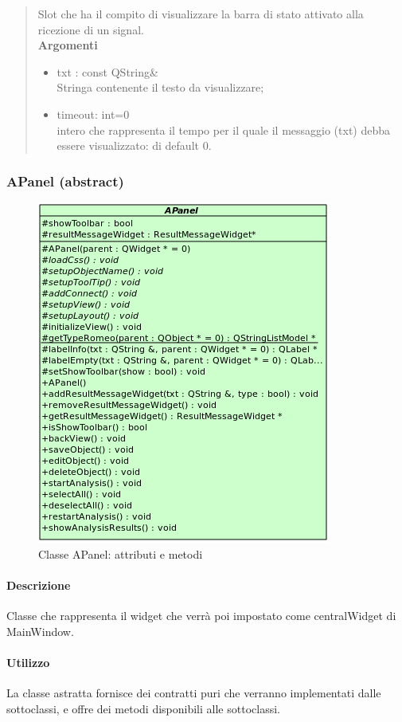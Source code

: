 \color{black}
\begin{quote}Slot\g{} che ha il compito di visualizzare la barra di stato attivato alla ricezione di un signal\g{}.\\ 
\textbf{Argomenti\\}
\begin{itemize}
\item txt : const QString\& \\ Stringa contenente il testo da visualizzare;
\item timeout: int=0 \\ intero che rappresenta il tempo per il quale il messaggio (txt) debba essere visualizzato: di default 0.
\end{itemize}
\end{quote} 
\color{black}
\pagebreak
\subsubsection{APanel (abstract)}
\label{speAPanel}
\begin{figure}[!h]
\centering
			\includegraphics[width=0.4\linewidth]{./Content/Immagini/view/APanel.png}
			\caption{Classe APanel: attributi e metodi}
			\label{cl_apanelV}
\end{figure}
\paragraph{Descrizione \\}
Classe che rappresenta il widget che verrà poi impostato come centralWidget di MainWindow.
\paragraph{Utilizzo\\}
La classe astratta fornisce dei contratti puri che verranno implementati dalle sottoclassi, e offre dei metodi disponibili alle sottoclassi.

